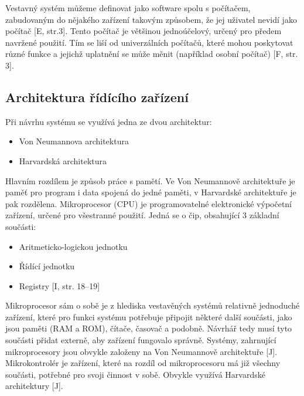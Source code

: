 Vestavný systém můžeme definovat jako software spolu s počítačem, zabudovaným do nějakého zařízení takovým způsobem, že jej uživatel nevidí jako počítač [E, str.3]. Tento počítač je většinou jednoúčelový, určený pro předem navržené použití. Tím se liší od univerzálních počítačů, které mohou poskytovat různé funkce a jejichž uplatnění se může měnit (například osobní počítač) [F, str. 3].



\subsection*{Architektura řídícího zařízení}

Při návrhu systému se využívá jedna ze dvou architektur:

\begin{itemize}
    \item Von Neumannova architektura
    \item Harvardská architektura
\end{itemize}

Hlavním rozdílem je způsob práce s pamětí. Ve Von Neumannově architektuře je paměť pro program i data spojená do jedné paměti, v Harvardské architektuře je pak rozdělena. \newline
Mikroprocesor (CPU) je programovatelné elektronické výpočetní zařízení, určené pro všestranné použití. Jedná se o čip, obsahující 3 základní součásti:
\begin{itemize}
    \item Aritmeticko-logickou jednotku
    \item Řídící jednotku
    \item Registry [I, str. 18–19]
\end{itemize}

Mikroprocesor sám o sobě je z hlediska vestavěných systémů relativně jednoduché zařízení, které pro funkci systému potřebuje připojit některé další součásti, jako jsou paměti (RAM a ROM), čítače, časovač a podobně. Návrhář tedy musí tyto součásti přidat externě, aby zařízení fungovalo správně. Systémy, zahrnující mikroprocesory jsou obvykle založeny na Von Neumannově architektuře [J].\newline
Mikrokontrolér je zařízení, které na rozdíl od mikroprocesoru má již všechny součásti, potřebné pro svoji činnost v sobě. Obvykle využívá Harvardské architektury [J]. 

